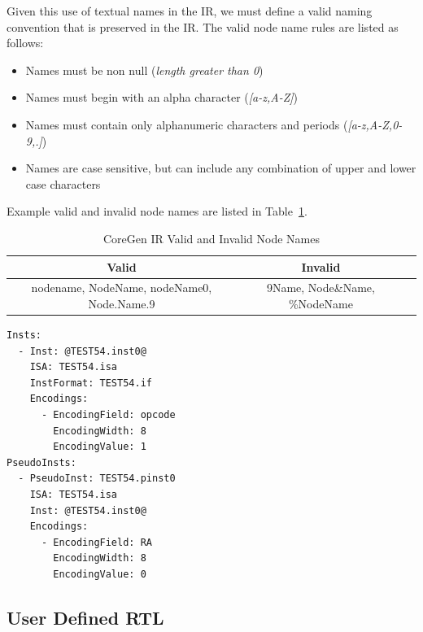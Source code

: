\documentclass{article}
\begin{document}
Given this use of textual names in the IR, we must define a valid naming convention that is preserved in the IR.  The valid node 
name rules are listed as follows: 

\begin{itemize}
\item Names must be non null (\textit{length greater than 0})
\item Names must begin with an alpha character (\textit{[a-z,A-Z]})
\item Names must contain only alphanumeric characters and periods (\textit{[a-z,A-Z,0-9,.]})
\item Names are case sensitive, but can include any combination of upper and lower case characters
\end{itemize}

Example valid and invalid node names are listed in Table~\ref{tab:validinvalidnames}.  

\begin{table}[h]
\begin{center}
\caption{CoreGen IR Valid and Invalid Node Names}
\vspace{0.125in}
\label{tab:validinvalidnames}
\begin{tabular}{|c|c|l}
\hline
\textbf{Valid} & \textbf{Invalid}\\
\hline
nodename, NodeName, nodeName0, Node.Name.9 & 9Name, Node\&Name, \%NodeName\\
\hline
\end{tabular}
\end{center}
\end{table} 

\clearpage
\vspace{0.125in}
\begin{lstlisting}[frame=single,style=base,showstringspaces=false,caption={Node Naming and Linkage},captionpos=b,label={lis:nodenames}]
Insts:
  - Inst: @TEST54.inst0@
    ISA: TEST54.isa
    InstFormat: TEST54.if
    Encodings:
      - EncodingField: opcode
        EncodingWidth: 8
        EncodingValue: 1
PseudoInsts:
  - PseudoInst: TEST54.pinst0
    ISA: TEST54.isa
    Inst: @TEST54.inst0@
    Encodings:
      - EncodingField: RA
        EncodingWidth: 8
        EncodingValue: 0
\end{lstlisting}  

\subsection{User Defined RTL}
\label{sec:UserDefinedRTL}
\end{document}
